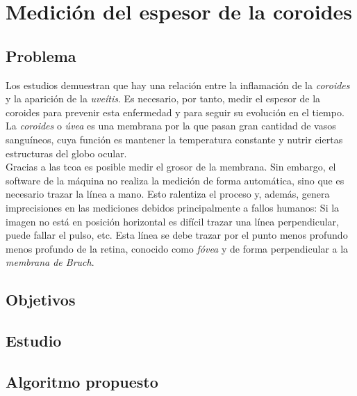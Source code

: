 \chapter{Medición del espesor de la coroides}
\section{Problema}
Los estudios demuestran que hay una relación
entre la inflamación de la \emph{coroides}
y la aparición de la \emph{uveítis}. Es 
necesario, por tanto, medir el espesor de
la coroides para prevenir esta enfermedad
y para seguir su evolución en el tiempo.\\
La \emph{coroides} o \emph{úvea} es una 
membrana por la que pasan gran cantidad de 
vasos sanguíneos, cuya función es mantener 
la temperatura constante y nutrir ciertas 
estructuras del globo ocular. \\
Gracias a las \gls{tcoa} es posible medir 
el grosor de la membrana. Sin embargo, 
el software de la máquina no realiza la 
medición de forma automática, sino que es 
necesario trazar la línea a mano. Esto 
ralentiza el proceso y, además, 
genera imprecisiones en las mediciones 
debidos principalmente a fallos humanos: 
Si la imagen no está en posición horizontal
es difícil trazar una línea perpendicular, 
puede fallar el pulso, etc. Esta línea se 
debe trazar por el punto menos profundo 
menos profundo de la retina, conocido como 
\emph{fóvea} y de forma perpendicular a la  
\emph{membrana de Bruch}.


\section{Objetivos}
\section{Estudio}
\section{Algoritmo propuesto}
